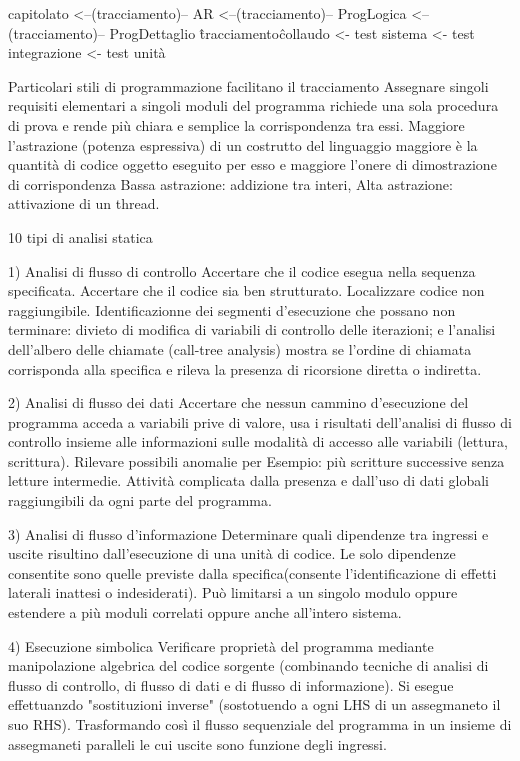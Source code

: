 \documentclass{report}
\begin{document}
capitolato <--(tracciamento)-- AR <--(tracciamento)-- ProgLogica <--(tracciamento)-- ProgDettaglio 
\^tracciamento\^
collaudo <- test sistema <- test integrazione <- test unità

Particolari stili di programmazione facilitano il tracciamento
Assegnare singoli requisiti elementari a singoli moduli del programma richiede una sola procedura di prova e rende più chiara e semplice la corrispondenza tra essi.
Maggiore l’astrazione (potenza espressiva) di un costrutto del linguaggio maggiore è la quantità di codice oggetto eseguito per esso e maggiore l’onere di dimostrazione di corrispondenza
Bassa astrazione: addizione tra interi,
Alta astrazione: attivazione di un thread.

10 tipi di analisi statica

1) Analisi di flusso di controllo
Accertare che il codice esegua nella sequenza specificata.
Accertare che il codice sia ben strutturato.
Localizzare codice non raggiungibile.
Identificazionne dei segmenti d'esecuzione che possano non terminare: divieto di modifica di variabili di controllo delle iterazioni;
e l’analisi dell’albero delle chiamate (call-tree analysis) mostra se l’ordine di chiamata corrisponda alla specifica e rileva la presenza di ricorsione diretta o indiretta.

2) Analisi di flusso dei dati
Accertare che nessun cammino d’esecuzione del programma acceda a variabili prive di valore, usa i risultati dell’analisi di flusso di controllo insieme alle informazioni sulle modalità di accesso alle variabili (lettura, scrittura).
Rilevare possibili anomalie per Esempio: più scritture successive senza letture intermedie.
Attività complicata dalla presenza e dall’uso di dati globali raggiungibili da ogni parte del programma.

3) Analisi di flusso d'informazione
Determinare quali dipendenze tra ingressi e uscite risultino dall'esecuzione di una unità di codice.
Le solo dipendenze consentite sono quelle previste dalla specifica(consente l'identificazione di effetti  laterali inattesi o indesiderati).
Può limitarsi a un singolo modulo oppure estendere a più moduli correlati oppure anche all'intero sistema.

4) Esecuzione simbolica
Verificare proprietà del programma mediante manipolazione algebrica del codice sorgente (combinando tecniche di analisi di flusso di controllo, di flusso di dati e di flusso di informazione).
Si esegue effettuanzdo "sostituzioni inverse" (sostotuendo a ogni LHS di un assegmaneto il suo RHS).
Trasformando così il flusso sequenziale del programma in un insieme di assegmaneti paralleli le cui uscite sono funzione degli ingressi.
\end{document}
